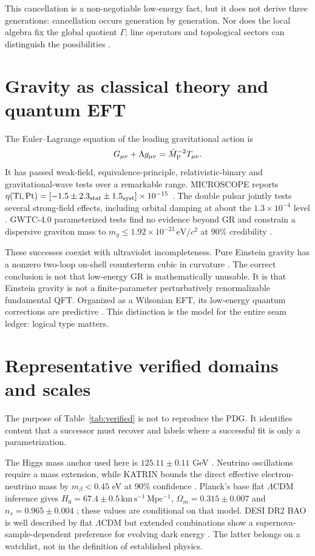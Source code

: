 \documentclass[11pt,a4paper]{article}
\newcommand{\Mpl}{\bar M_{\rm P}}
\begin{document}
This cancellation is a non-negotiable low-energy fact, but it does not derive three generations: cancellation occurs generation by generation.  Nor does the local algebra fix the global quotient $\Gamma$; line operators and topological sectors can distinguish the possibilities \cite{Tong2017,Hsin2024}.

\section{Gravity as classical theory and quantum EFT}
The Euler--Lagrange equation of the leading gravitational action is
\begin{equation}
G_{\mu\nu}+\Lambda g_{\mu\nu}=\Mpl^{-2}T_{\mu\nu}.
\end{equation}
It has passed weak-field, equivalence-principle, relativistic-binary and gravitational-wave tests over a remarkable range.  MICROSCOPE reports $\eta({\rm Ti,Pt})=[-1.5\pm2.3_{\rm stat}\pm1.5_{\rm syst}]\times10^{-15}$ \cite{MICROSCOPE2022}.  The double pulsar jointly tests several strong-field effects, including orbital damping at about the $1.3\times10^{-4}$ level \cite{DoublePulsar2021}.  GWTC-4.0 parameterized tests find no evidence beyond GR and constrain a dispersive graviton mass to $m_g\le1.92\times10^{-23}\,\mathrm{eV}/c^2$ at 90\% credibility \cite{GWTC4GR2026}.

These successes coexist with ultraviolet incompleteness.  Pure Einstein gravity has a nonzero two-loop on-shell counterterm cubic in curvature \cite{GoroffSagnotti1986}.  The correct conclusion is not that low-energy GR is mathematically unusable.  It is that Einstein gravity is not a finite-parameter perturbatively renormalizable fundamental QFT.  Organized as a Wilsonian EFT, its low-energy quantum corrections are predictive \cite{Donoghue1994}.  This distinction is the model for the entire seam ledger: logical type matters.

\section{Representative verified domains and scales}
The purpose of Table~\ref{tab:verified} is not to reproduce the PDG.  It identifies content that a successor must recover and labels where a successful fit is only a parametrization.



The Higgs mass anchor used here is $125.11\pm0.11$ GeV \cite{ATLASHiggs2023}.  Neutrino oscillations require a mass extension, while KATRIN bounds the direct effective electron-neutrino mass by $m_\beta<0.45$ eV at 90\% confidence \cite{KATRIN2025}.  Planck's base flat $\Lambda$CDM inference gives $H_0=67.4\pm0.5\,\mathrm{km\,s^{-1}\,Mpc^{-1}}$, $\Omega_m=0.315\pm0.007$ and $n_s=0.965\pm0.004$ \cite{Planck2018}; these values are conditional on that model.  DESI DR2 BAO is well described by flat $\Lambda$CDM but extended combinations show a supernova-sample-dependent preference for evolving dark energy \cite{DESIDR22025}.  The latter belongs on a watchlist, not in the definition of established physics.
\end{document}

